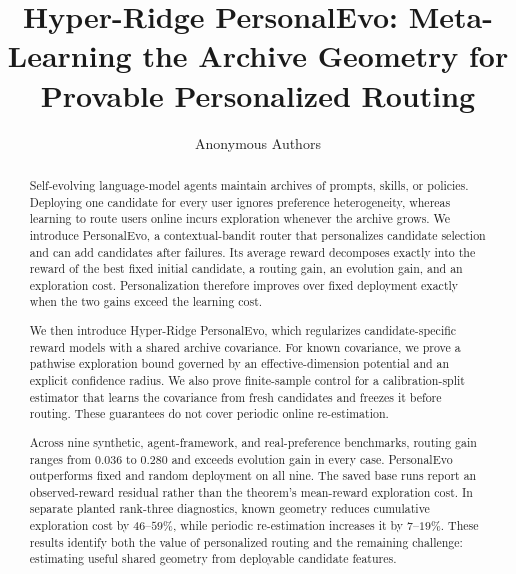 \documentclass{article} %
\title{Hyper-Ridge PersonalEvo: Meta-Learning the Archive Geometry for Provable Personalized Routing}
\author{Anonymous Authors}
\begin{document}
\allowdisplaybreaks[3]

\maketitle



\begin{abstract}
Self-evolving language-model agents maintain archives of prompts, skills, or
policies. Deploying one candidate for every user ignores preference
heterogeneity, whereas learning to route users online incurs exploration
whenever the archive grows. We introduce PersonalEvo, a contextual-bandit
router that personalizes candidate selection and can add candidates after
failures. Its average reward decomposes exactly into the reward of the best
fixed initial candidate, a routing gain, an evolution gain, and an exploration
cost. Personalization therefore improves over fixed deployment exactly when
the two gains exceed the learning cost.

We then introduce Hyper-Ridge PersonalEvo, which regularizes
candidate-specific reward models with a shared archive covariance. For known
covariance, we prove a pathwise exploration bound governed by an
effective-dimension potential and an explicit confidence radius. We also prove
finite-sample control for a calibration-split estimator that learns the
covariance from fresh candidates and freezes it before routing. These
guarantees do not cover periodic online re-estimation.

Across nine synthetic, agent-framework, and real-preference benchmarks,
routing gain ranges from $0.036$ to $0.280$ and exceeds evolution gain in every
case. PersonalEvo outperforms fixed and random deployment on all nine. The
saved base runs report an observed-reward residual rather than the theorem's
mean-reward exploration cost. In separate planted rank-three diagnostics,
known geometry reduces cumulative exploration cost by $46$--$59\%$, while
periodic re-estimation increases it by $7$--$19\%$. These results identify both
the value of personalized routing and the remaining challenge: estimating
useful shared geometry from deployable candidate features.
\end{abstract}
\end{document}
